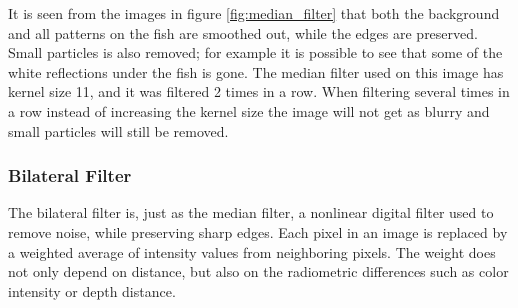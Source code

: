 It is seen from the images in figure \ref{fig:median_filter} that both the background and all patterns on the fish are smoothed out, while the edges are preserved. Small particles is also removed; for example it is possible to see that some of the white reflections under the fish is gone. The median filter used on this image has kernel size 11, and it was filtered 2 times in a row. When filtering several times in a row instead of increasing the kernel size the image will not get as blurry and small particles will still be removed.


\subsubsection{Bilateral Filter}
The bilateral filter is, just as the median filter, a nonlinear digital filter used to remove noise, while preserving sharp edges. Each pixel in an image is replaced by a weighted average of intensity values from neighboring pixels. The weight does not only depend on distance, but also on the radiometric differences such as color intensity or depth distance. 

